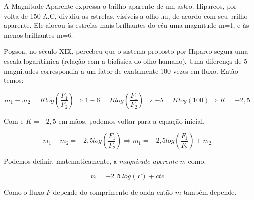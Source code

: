 A Magnitude Aparente expressa o brilho aparente de um astro. Hiparcos, por volta de 150 A.C, dividiu as estrelas, visíveis a olho nu, de acordo com seu brilho aparente. Ele alocou às estrelas mais brilhantes do céu uma magnitude m=1, e às menos brilhantes m=6.

Pogson, no século XIX, percebeu que o sistema proposto por Hiparco seguia uma escala logarítimica (relação com a biofísica do olho humano). Uma diferença de 5 magnitudes correspondia a um fator de exatamente 100 vezes em fluxo. Então temos: 

$$m_{1} - m_{2} = K log \left(\frac{F_{1}}{F_{2}} \right) \Rightarrow 1 - 6 = K log \left(\frac{F_{1}}{F_{2}} \right) \Rightarrow -5 = K log(100) \Rightarrow K = -2,5$$

Com o $K = -2,5$ em mãos, podemos voltar para a equação inicial.

$$m_{1} - m_{2} = -2,5 log \left(\frac{F_{1}}{F_{2}} \right) \Rightarrow m_{1} = -2,5 log \left(\frac{F_{1}}{F_{2}} \right) + m_{2}$$

Podemos definir, matematicamente, a \textit{magnitude aparente} $m$ como:

$$m = -2,5 \ log(F) + cte$$

Como o fluxo $F$ depende do comprimento de onda então $m$ também depende.